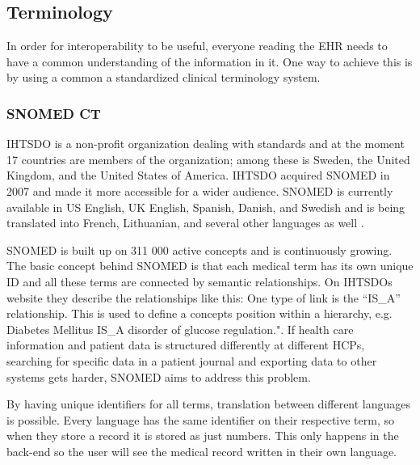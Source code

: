 \documentclass[14pt]{article}
\begin{document}

\subsection{Terminology}
\label{sec:TechnicalStandardsTerminology}
In order for interoperability to be useful, everyone reading the \gls{EHR} needs to have a common understanding of the information in it. One way to achieve this is by using a common a standardized clinical terminology system.

\subsubsection{SNOMED CT}

\gls{IHTSDO} is a non-profit organization dealing with standards and at the moment 17 countries are members of the organization; among these is Sweden, the United Kingdom, and the United States of America. \gls{IHTSDO} acquired \gls{SNOMED} in 2007 and made it more accessible for a wider audience. \gls{SNOMED} is currently available in US English, UK English, Spanish, Danish, and Swedish and is being translated into French, Lithuanian, and several other languages as well \cite{ihtsdolang}.

\gls{SNOMED} is built up on 311 000 active concepts and is continuously growing. The basic concept behind \gls{SNOMED} is that each medical term has its own unique ID and all these terms are connected by semantic relationships. On \gls{IHTSDO}s website they describe the relationships like this: One type of link is the “IS\_A” relationship. This is used to define a concepts position within a hierarchy, e.g. Diabetes Mellitus IS\_A disorder of glucose regulation."\cite{ihtsdocomp}. If health care information and patient data is structured differently at different \glspl{HCP}, searching for specific data in a patient journal and exporting data to other systems gets harder, \gls{SNOMED} aims to address this problem.

By having unique identifiers for all terms, translation between different languages is possible. Every language has the same identifier on their respective term, so when they store a record it is stored as just numbers. This only happens in the back-end so the user will see the medical record written in their own language.
\end{document}
